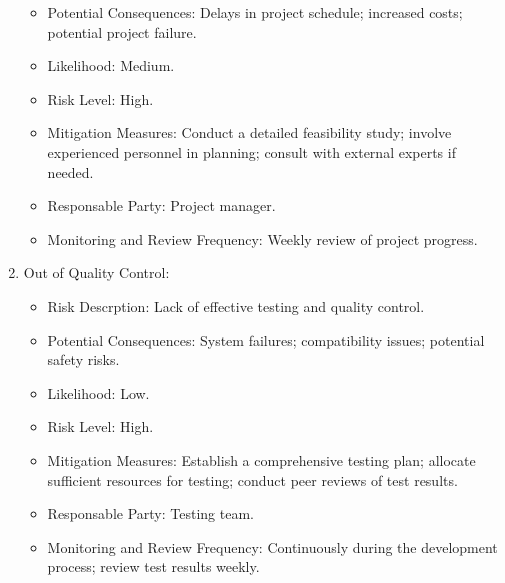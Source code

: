 \documentclass{article}
\begin{document}
\begin{enumerate}
\begin{itemize}
        \item Potential Consequences: Delays in project schedule; increased costs; potential project failure.
        \item Likelihood: Medium.
        \item Risk Level: High.
        \item Mitigation Measures: Conduct a detailed feasibility study; involve experienced personnel in planning; consult with external experts if needed.
        \item Responsable Party: Project manager.
        \item Monitoring and Review Frequency: Weekly review of project progress.
    \end{itemize}
    \item Out of Quality Control:
    \begin{itemize}
        \item Risk Descrption: Lack of effective testing and quality control.
        \item Potential Consequences: System failures; compatibility issues; potential safety risks.
        \item Likelihood: Low.
        \item Risk Level: High.
        \item Mitigation Measures: Establish a comprehensive testing plan; allocate sufficient resources for testing; conduct peer reviews of test results.
        \item Responsable Party: Testing team.
        \item Monitoring and Review Frequency: Continuously during the development process; review test results weekly.
    \end{itemize}
\end{enumerate}
\end{document}
